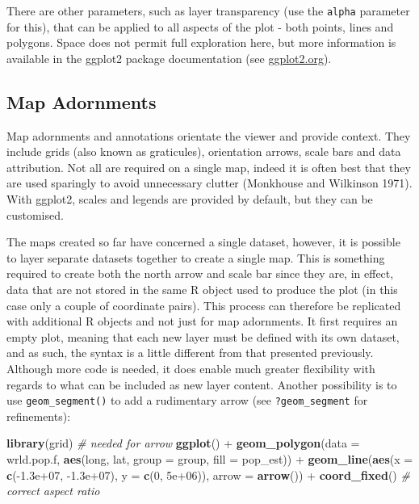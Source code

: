 \documentclass[]{article}
\newenvironment{Shaded}{}{}
\newcommand{\KeywordTok}[1]{\textcolor[rgb]{0.00,0.44,0.13}{\textbf{{#1}}}}
\newcommand{\DataTypeTok}[1]{\textcolor[rgb]{0.56,0.13,0.00}{{#1}}}
\newcommand{\DecValTok}[1]{\textcolor[rgb]{0.25,0.63,0.44}{{#1}}}
\newcommand{\FloatTok}[1]{\textcolor[rgb]{0.25,0.63,0.44}{{#1}}}
\newcommand{\CommentTok}[1]{\textcolor[rgb]{0.38,0.63,0.69}{\textit{{#1}}}}
\newcommand{\NormalTok}[1]{{#1}}
\begin{document}
There are other parameters, such as layer transparency (use the
\texttt{alpha} parameter for this), that can be applied to all aspects of
the plot - both points, lines and polygons. Space does not permit full
exploration here, but more information is available in the ggplot2
package documentation (see \href{http://ggplot2.org/}{ggplot2.org}).

\subsection{Map Adornments}

Map adornments and annotations orientate the viewer and provide context.
They include grids (also known as graticules), orientation arrows, scale
bars and data attribution. Not all are required on a single map, indeed
it is often best that they are used sparingly to avoid unnecessary
clutter (Monkhouse and Wilkinson 1971). With ggplot2, scales and legends
are provided by default, but they can be customised.

The maps created so far have concerned a single dataset, however, it is possible to layer
separate datasets together to create a single map. This is something required to create both the north arrow and scale bar since they are, in effect, data that are not stored in the same R object used to produce the plot (in this case only a couple of coordinate pairs). This process can therefore be replicated with additional R objects and not just for map adornments. It first requires an empty plot, meaning that each new layer must be defined with
its own dataset, and as such, the syntax is a little different from that presented previously. Although more code is needed, it does enable
much greater flexibility with regards to what can be included as new
layer content. Another possibility is to use \texttt{geom\_segment()}
to add a rudimentary arrow (see \texttt{?geom\_segment} for
refinements):

\begin{Shaded}
\begin{Highlighting}[]
\KeywordTok{library}\NormalTok{(grid)  }\CommentTok{# needed for arrow}
\KeywordTok{ggplot}\NormalTok{() + }\KeywordTok{geom_polygon}\NormalTok{(}\DataTypeTok{data =} \NormalTok{wrld.pop.f, }\KeywordTok{aes}\NormalTok{(long, lat, }\DataTypeTok{group =} \NormalTok{group, }\DataTypeTok{fill =} \NormalTok{pop_est)) + }
    \KeywordTok{geom_line}\NormalTok{(}\KeywordTok{aes}\NormalTok{(}\DataTypeTok{x =} \KeywordTok{c}\NormalTok{(-}\FloatTok{1.3e+07}\NormalTok{, -}\FloatTok{1.3e+07}\NormalTok{), }\DataTypeTok{y =} \KeywordTok{c}\NormalTok{(}\DecValTok{0}\NormalTok{, }\FloatTok{5e+06}\NormalTok{)), }\DataTypeTok{arrow =} \KeywordTok{arrow}\NormalTok{()) + }
    \KeywordTok{coord_fixed}\NormalTok{()  }\CommentTok{# correct aspect ratio}
\end{Highlighting}
\end{Shaded}
\end{document}
